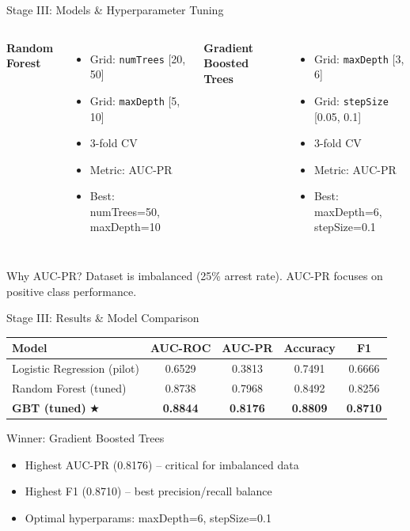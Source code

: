 \documentclass[10pt]{beamer}
\begin{document}
\begin{frame}{Stage III: Models \& Hyperparameter Tuning}
\begin{columns}
\textbf{Random Forest}
\begin{itemize}
    \item Grid: \texttt{numTrees} [20, 50]
    \item Grid: \texttt{maxDepth} [5, 10]
    \item 3-fold CV
    \item Metric: AUC-PR
    \item Best: numTrees=50, maxDepth=10
\end{itemize}

\textbf{Gradient Boosted Trees}
\begin{itemize}
    \item Grid: \texttt{maxDepth} [3, 6]
    \item Grid: \texttt{stepSize} [0.05, 0.1]
    \item 3-fold CV
    \item Metric: AUC-PR
    \item Best: maxDepth=6, stepSize=0.1
\end{itemize}
\end{columns}

\vspace{0.3cm}
\begin{exampleblock}{Why AUC-PR?}
Dataset is imbalanced (25\% arrest rate). AUC-PR focuses on positive class performance.
\end{exampleblock}
\end{frame}

\begin{frame}{Stage III: Results \& Model Comparison}
\begin{table}
\centering
\begin{tabular}{lcccc}
\toprule
\textbf{Model} & \textbf{AUC-ROC} & \textbf{AUC-PR} & \textbf{Accuracy} & \textbf{F1} \\
\midrule
Logistic Regression (pilot) & 0.6529 & 0.3813 & 0.7491 & 0.6666 \\
Random Forest (tuned) & 0.8738 & 0.7968 & 0.8492 & 0.8256 \\
\textbf{GBT (tuned)} $\bigstar$ & \textbf{0.8844} & \textbf{0.8176} & \textbf{0.8809} & \textbf{0.8710} \\
\bottomrule
\end{tabular}
\end{table}

\begin{block}{Winner: Gradient Boosted Trees}
\begin{itemize}
    \item Highest AUC-PR (0.8176) -- critical for imbalanced data
    \item Highest F1 (0.8710) -- best precision/recall balance
    \item Optimal hyperparams: maxDepth=6, stepSize=0.1
\end{itemize}
\end{block}
\end{frame}
\end{document}
